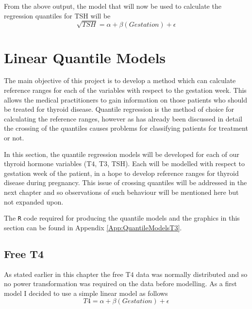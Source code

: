 \documentclass[12pt,a4paper]{report}
\begin{document}
From the above output, the model that will now be used to calculate the regression quantiles for TSH will be
$$ \sqrt{TSH} = \alpha + \beta (Gestation) + \epsilon$$


\section{Linear Quantile Models}
The main objective of this project is to develop a method which can calculate reference ranges for each of the variables with respect to the gestation week. This allows the medical practitioners to gain information on those patients who should be treated for thyroid disease. Quantile regression is the method of choice for calculating the reference ranges, however as has already been discussed in detail the crossing of the quantiles causes problems for classifying patients for treatment or not.
\vspace{2mm}

In this section, the quantile regression models will be developed for each of our thyroid hormone variables (T$4$, T$3$, TSH). Each will be modelled with respect to gestation week of the patient, in a hope to develop reference ranges for thyroid disease during pregnancy. This issue of crossing quantiles will be addressed in the next chapter and so observations of such behaviour will be mentioned here but not expanded upon.
\vspace{2mm}

The {\small{\verb"R"}} code required for producing the quantile models and the graphics in this section can be found in Appendix \ref{App:QuantileModelsT3}.

\subsection{Free T4}
As stated earlier in this chapter the free T$4$ data was normally distributed and so no power transformation was required on the data before modelling. As a first model I decided to use a simple linear model as follows
$$ T4 = \alpha + \beta(Gestation) + \epsilon$$
\end{document}
